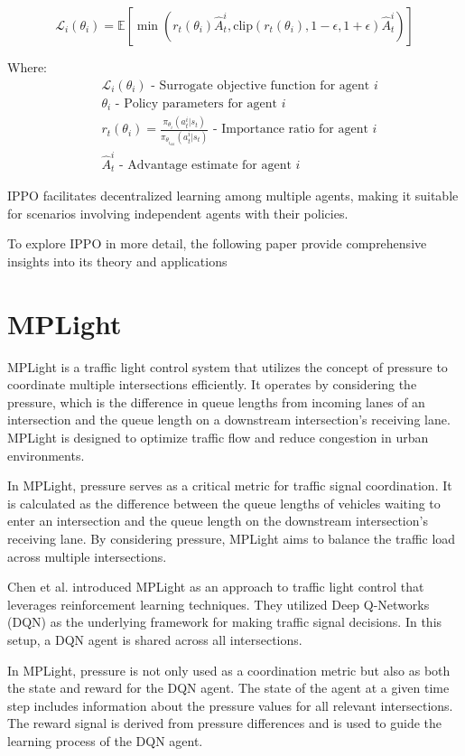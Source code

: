 \[
\mathcal{L}_i(\theta_i) = \mathbb{E}\left[\min\left(r_t(\theta_i)\hat{A}_t^i, \text{clip}\left(r_t(\theta_i), 1-\epsilon, 1+\epsilon\right)\hat{A}_t^i\right)\right]
\]

Where:
\begin{align*}
    &\mathcal{L}_i(\theta_i) \text{ - Surrogate objective function for agent } i\\
    &\theta_i \text{ - Policy parameters for agent } i\\
    &r_t(\theta_i) = \frac{\pi_{\theta_i}(a_t^i|s_t)}{\pi_{\theta_{i_{\text{old}}}}(a_t^i|s_t)} \text{ - Importance ratio for agent } i\\
    &\hat{A}_t^i \text{ - Advantage estimate for agent } i
\end{align*}

IPPO facilitates decentralized learning among multiple agents, making it suitable for scenarios involving independent agents with their policies.


To explore IPPO in more detail, the following paper\cite{ault2020learning} provide comprehensive insights into its theory and applications


\section{MPLight}\label{sec:MPLight}
MPLight\cite{chen2020toward} is a traffic light control system that utilizes the concept of pressure to coordinate multiple intersections efficiently. It operates by considering the pressure, which is the difference in queue lengths from incoming lanes of an intersection and the queue length on a downstream intersection's receiving lane. MPLight is designed to optimize traffic flow and reduce congestion in urban environments.

In MPLight, pressure serves as a critical metric for traffic signal coordination. It is calculated as the difference between the queue lengths of vehicles waiting to enter an intersection and the queue length on the downstream intersection's receiving lane. By considering pressure, MPLight aims to balance the traffic load across multiple intersections.

Chen et al. introduced MPLight as an approach to traffic light control that leverages reinforcement learning techniques. They utilized Deep Q-Networks (DQN) as the underlying framework for making traffic signal decisions. In this setup, a DQN agent is shared across all intersections.

In MPLight, pressure is not only used as a coordination metric but also as both the state and reward for the DQN agent. The state of the agent at a given time step includes information about the pressure values for all relevant intersections. The reward signal is derived from pressure differences and is used to guide the learning process of the DQN agent.

